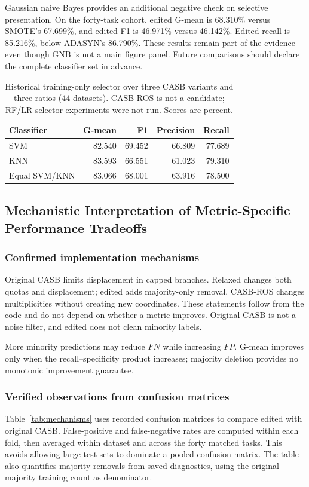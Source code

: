 \documentclass[conference]{IEEEtran}
\begin{document}
Gaussian naive Bayes provides an additional negative check on selective presentation. On the forty-task cohort, edited G-mean is 68.310\% versus SMOTE's 67.699\%, and edited F1 is 46.971\% versus 46.142\%. Edited recall is 85.216\%, below ADASYN's 86.790\%. These results remain part of the evidence even though GNB is not a main figure panel. Future comparisons should declare the complete classifier set in advance.
\begin{table}[!t]
\centering\small
\caption{Historical training-only selector over three CASB variants and three ratios (44 datasets). CASB-ROS is not a candidate; RF/LR selector experiments were not run. Scores are percent.}\label{tab:selector}
\begin{tabular}{lrrrr}\toprule
Classifier & G-mean & F1 & Precision & Recall \\
\midrule
SVM & 82.540 & 69.452 & 66.809 & 77.689 \\
KNN & 83.593 & 66.551 & 61.023 & 79.310 \\
Equal SVM/KNN & 83.066 & 68.001 & 63.916 & 78.500 \\
\bottomrule\end{tabular}
\end{table}

\subsection{Mechanistic Interpretation of Metric-Specific Performance Tradeoffs}
\subsubsection{Confirmed implementation mechanisms}
Original CASB limits displacement in capped branches. Relaxed changes both quotas and displacement; edited adds majority-only removal. CASB-ROS changes multiplicities without creating new coordinates. These statements follow from the code and do not depend on whether a metric improves. Original CASB is not a noise filter, and edited does not clean minority labels.

More minority predictions may reduce $FN$ while increasing $FP$. G-mean improves only when the recall--specificity product increases; majority deletion provides no monotonic improvement guarantee.

\subsubsection{Verified observations from confusion matrices}
Table~\ref{tab:mechanisms} uses recorded confusion matrices to compare edited with original CASB. False-positive and false-negative rates are computed within each fold, then averaged within dataset and across the forty matched tasks. This avoids allowing large test sets to dominate a pooled confusion matrix. The table also quantifies majority removals from saved diagnostics, using the original majority training count as denominator.
\end{document}
